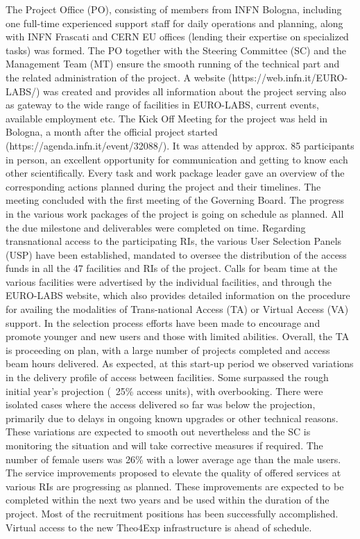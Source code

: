 The Project Office (PO), consisting of members from INFN Bologna, including one full-time experienced support staff for daily operations and planning, along with INFN Frascati and CERN EU offices (lending their expertise on specialized tasks) was formed. The PO together with the Steering Committee (SC) and the Management Team (MT) ensure the smooth running of the technical part and the related administration of the project. A website (https://web.infn.it/EURO-LABS/) was created and provides all information about the project serving also as gateway to the wide range of facilities in EURO-LABS, current events, available employment etc. The Kick Off Meeting for the project was held in Bologna, a month after the official project started (https://agenda.infn.it/event/32088/). It was attended by approx. 85 participants in person, an excellent opportunity for communication and getting to know each other scientifically. Every task and work package leader gave an overview of the corresponding actions planned during the project and their timelines. The meeting concluded with the first meeting of the Governing Board.  
The progress in the various work packages of the project is going on schedule as planned. All the due milestone and deliverables were completed on time. Regarding transnational access to the participating RIs, the various User Selection Panels (USP) have been established, mandated to oversee the distribution of the access funds in all the 47 facilities and RIs of the project. Calls for beam time at the various facilities were advertised by the individual facilities, and through the EURO-LABS website, which also provides detailed information on the procedure for availing the modalities of Trans-national Access (TA) or Virtual Access (VA) support. In the selection process efforts have been made to encourage and promote younger and new users and those with limited abilities. Overall, the TA is proceeding on plan, with a large number of projects completed and access beam hours delivered.  As expected, at this start-up period we observed variations in the delivery profile of access between facilities. Some surpassed the rough initial year’s projection (~25\% access units), with overbooking. There were isolated cases where the access delivered so far was below the projection, primarily due to delays in ongoing known upgrades or other technical reasons. These variations are expected to smooth out nevertheless and the SC is monitoring the situation and will take corrective measures if required.  The number of female users was 26\% with a lower average age than the male users. The service improvements proposed to elevate the quality of offered services at various RIs are progressing as planned. These improvements are expected to be completed within the next two years and be used within the duration of the project. Most of the recruitment positions has been successfully accomplished. Virtual access to the new Theo4Exp infrastructure is ahead of schedule.


